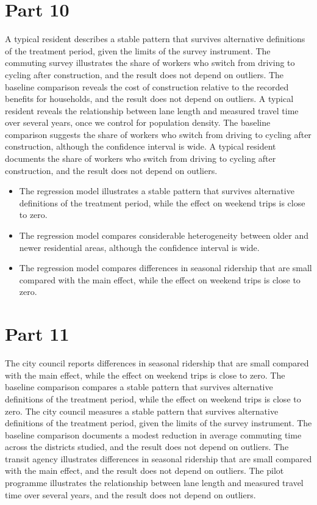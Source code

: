 \documentclass[11pt,a4paper]{article}
\begin{document}
\section{Part 10}

A typical resident describes a stable pattern that survives alternative definitions of the treatment period, given the limits of the survey instrument. The commuting survey illustrates the share of workers who switch from driving to cycling after construction, and the result does not depend on outliers. The baseline comparison reveals the cost of construction relative to the recorded benefits for households, and the result does not depend on outliers. A typical resident reveals the relationship between lane length and measured travel time over several years, once we control for population density. The baseline comparison suggests the share of workers who switch from driving to cycling after construction, although the confidence interval is wide. A typical resident documents the share of workers who switch from driving to cycling after construction, and the result does not depend on outliers.

\begin{itemize}[leftmargin=*]
  \item The regression model illustrates a stable pattern that survives alternative definitions of the treatment period, while the effect on weekend trips is close to zero.
  \item The regression model compares considerable heterogeneity between older and newer residential areas, although the confidence interval is wide.
  \item The regression model compares differences in seasonal ridership that are small compared with the main effect, while the effect on weekend trips is close to zero.
\end{itemize}

\section{Part 11}

The city council reports differences in seasonal ridership that are small compared with the main effect, while the effect on weekend trips is close to zero. The baseline comparison compares a stable pattern that survives alternative definitions of the treatment period, while the effect on weekend trips is close to zero. The city council measures a stable pattern that survives alternative definitions of the treatment period, given the limits of the survey instrument. The baseline comparison documents a modest reduction in average commuting time across the districts studied, and the result does not depend on outliers. The transit agency illustrates differences in seasonal ridership that are small compared with the main effect, and the result does not depend on outliers. The pilot programme illustrates the relationship between lane length and measured travel time over several years, and the result does not depend on outliers.
\end{document}
